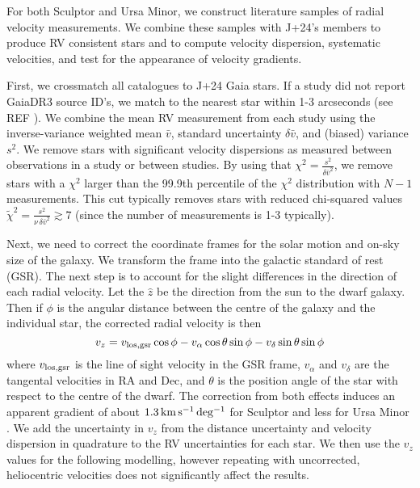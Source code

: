 For both Sculptor and Ursa Minor, we construct literature samples of
radial velocity measurements. We combine these samples with J+24's
members to produce RV consistent stars and to compute velocity
dispersion, systematic velocities, and test for the appearance of
velocity gradients.

First, we crossmatch all catalogues to J+24 Gaia stars. If a study did
not report GaiaDR3 source ID's, we match to the nearest star within 1-3
arcseconds (see REF \citet{tab:rv_measurements}). We combine the mean RV
measurement from each study using the inverse-variance weighted mean
\(\bar v\), standard uncertainty \(\delta \bar v\), and (biased)
variance \(s^2\). We remove stars with significant velocity dispersions
as measured between observations in a study or between studies. By using
that \(\chi^2=\frac{s^2}{\delta \bar v^2}\), we remove stars with a
\(\chi^2\) larger than the 99.9th percentile of the \(\chi^2\)
distribution with \(N-1\) measurements. This cut typically removes stars
with reduced chi-squared values
\(\tilde\chi^2  = \frac{s^2}{\nu\,\delta \bar v^2}\gtrsim 7\) (since the
number of measurements is 1-3 typically).

Next, we need to correct the coordinate frames for the solar motion and
on-sky size of the galaxy. We transform the frame into the galactic
standard of rest (GSR). The next step is to account for the slight
differences in the direction of each radial velocity. Let the \(\hat z\)
be the direction from the sun to the dwarf galaxy. Then if \(\phi\) is
the angular distance between the centre of the galaxy and the individual
star, the corrected radial velocity is then \begin{equation}
v_z = v_{\rm los, gsr}\cos\phi  - v_{\alpha}\cos\theta \sin\phi - v_\delta \sin\theta\sin\phi
\end{equation} where \(v_{\rm los, gsr}\) is the line of sight velocity
in the GSR frame, \(v_\alpha\) and \(v_\delta\) are the tangental
velocities in RA and Dec, and \(\theta\) is the position angle of the
star with respect to the centre of the dwarf. The correction from both
effects induces an apparent gradient of about \(1.3\,{\rm km\,s^{-1}\,deg^{-1}}\) for
Sculptor and less for Ursa Minor \citep[see
also][]{WMO2008, strigari2010}. We add the uncertainty in \(v_z\) from
the distance uncertainty and velocity dispersion in quadrature to the RV
uncertainties for each star. We then use the \(v_z\) values for the
following modelling, however repeating with uncorrected, heliocentric
velocities does not significantly affect the results.

